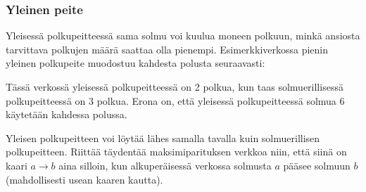 \subsubsection{Yleinen peite}

Yleisessä polkupeitteessä sama solmu voi kuulua moneen polkuun,
minkä ansiosta tarvittava polkujen määrä saattaa olla pienempi.
Esimerkkiverkossa pienin yleinen polkupeite muodostuu
kahdesta polusta seuraavasti:

\begin{center}
\end{center}

Tässä verkossä yleisessä polkupeitteessä on 2 polkua,
kun taas solmuerillisessä polkupeitteessä on 3 polkua.
Erona on, että yleisessä polkupeitteessä solmua 6
käytetään kahdessa polussa.

Yleisen polkupeitteen voi löytää lähes samalla
tavalla kuin solmuerillisen polkupeitteen.
Riittää täydentää maksimiparituksen verkkoa niin,
että siinä on kaari $a \rightarrow b$ aina silloin,
kun alkuperäisessä verkossa solmusta $a$ pääsee
solmuun $b$ (mahdollisesti usean kaaren kautta).

